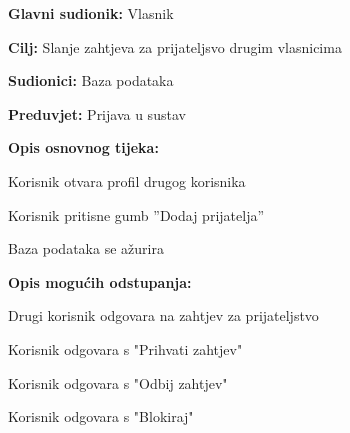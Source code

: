 				\noindent {}
				\begin{packed_item}
					
					\item \textbf{Glavni sudionik: } Vlasnik
					\item  \textbf{Cilj:} Slanje zahtjeva za prijateljsvo drugim vlasnicima
					\item  \textbf{Sudionici:} Baza podataka
					\item  \textbf{Preduvjet:} Prijava u sustav
					\item  \textbf{Opis osnovnog tijeka:}
					
					\item[] \begin{packed_enum}
						
						\item Korisnik otvara profil drugog korisnika 
						\item Korisnik pritisne gumb ”Dodaj prijatelja”
						\item Baza podataka se ažurira
					\end{packed_enum}
					
					\item  \textbf{Opis mogućih odstupanja:}
					
					\item[] \begin{packed_item}
						
						\item[2.a] Drugi korisnik odgovara na zahtjev za prijateljstvo
						\item[] \begin{packed_enum}
							
							\item Korisnik odgovara s "Prihvati zahtjev"
							\item Korisnik odgovara s "Odbij zahtjev"
							\item Korisnik odgovara s "Blokiraj"
							
						\end{packed_enum}
					\end{packed_item}
				\end{packed_item}
				
